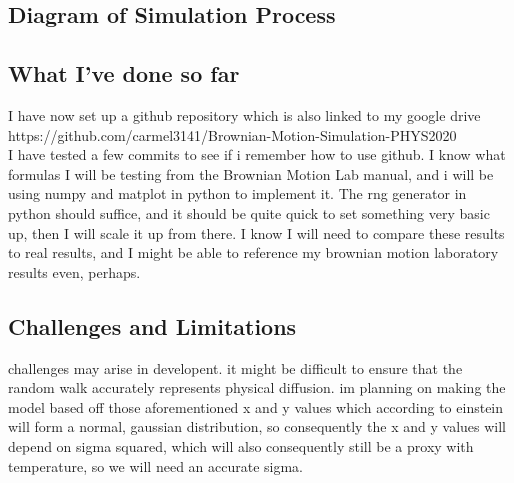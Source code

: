 \documentclass[12pt]{article}
\begin{document}
\subsection{Diagram of Simulation Process}

\begin{center}
\end{center}

\subsection{What I've done so far}
I have now set up a github repository which is also linked to my google drive\\
https://github.com/carmel3141/Brownian-Motion-Simulation-PHYS2020\\
I have tested a few commits to see if i remember how to use github.
I know what formulas I will be testing from the Brownian Motion Lab manual, and i will be using numpy and matplot in python to implement it. The rng generator in python should suffice, and it should be quite quick to set something very basic up, then I will scale it up from there. I know I will need to compare these results to real results, and I might be able to reference my brownian motion laboratory results even, perhaps. 

\subsection{Challenges and Limitations}

challenges may arise in developent. it might be difficult to ensure that the random walk accurately represents physical diffusion. im planning on making the model based off those aforementioned x and y values which according to einstein will form a normal, gaussian distribution, so consequently the x and y values will depend on sigma squared, which will also consequently still be a proxy with temperature, so we will need an accurate sigma.\\
\end{document}
